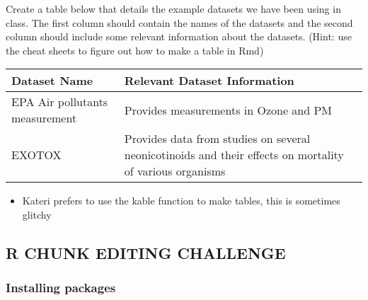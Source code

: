 \documentclass[]{article}
\providecommand{\tightlist}{%
  \setlength{\itemsep}{0pt}\setlength{\parskip}{0pt}}
\begin{document}
Create a table below that details the example datasets we have been
using in class. The first column should contain the names of the
datasets and the second column should include some relevant information
about the datasets. (Hint: use the cheat sheets to figure out how to
make a table in Rmd)

\begin{longtable}[]{@{}ll@{}}
\toprule
\begin{minipage}[b]{0.42\columnwidth}\raggedright
Dataset Name\strut
\end{minipage} & \begin{minipage}[b]{0.52\columnwidth}\raggedright
Relevant Dataset Information\strut
\end{minipage}\tabularnewline
\midrule
\endhead
\begin{minipage}[t]{0.42\columnwidth}\raggedright
EPA Air pollutants measurement\strut
\end{minipage} & \begin{minipage}[t]{0.52\columnwidth}\raggedright
Provides measurements in Ozone and PM\strut
\end{minipage}\tabularnewline
\begin{minipage}[t]{0.42\columnwidth}\raggedright
EXOTOX\strut
\end{minipage} & \begin{minipage}[t]{0.52\columnwidth}\raggedright
Provides data from studies on several neonicotinoids and their effects
on mortality of various organisms\strut
\end{minipage}\tabularnewline
\bottomrule
\end{longtable}

\begin{itemize}
\tightlist
\item
  Kateri prefers to use the kable function to make tables, this is
  sometimes glitchy
\end{itemize}

\hypertarget{r-chunk-editing-challenge}{%
\subsection{R CHUNK EDITING CHALLENGE}\label{r-chunk-editing-challenge}}

\hypertarget{installing-packages}{%
\subsubsection{Installing packages}\label{installing-packages}}
\end{document}
